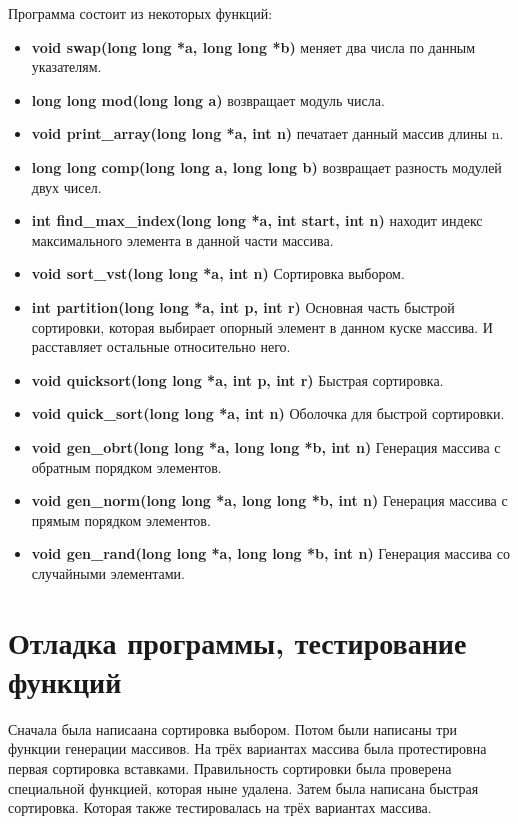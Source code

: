 \documentclass[a4paper,12pt,titlepage,final]{article}
\begin{document}
Программа состоит из некоторых функций:
\begin{itemize}
  \item {\bf void swap(long long *a, long long *b)} меняет два числа по данным указателям.
  \item {\bf long long mod(long long a)} возвращает модуль числа.
  \item {\bf void print\_array(long long *a, int n)} печатает данный массив длины n.
  \item {\bf long long comp(long long a, long long b)} возвращает разность модулей двух чисел.
  \item {\bf int find\_max\_index(long long *a, int start, int n)} находит индекс максимального элемента в данной части массива.
  \item {\bf void sort\_vst(long long *a, int n)} Сортировка выбором.
  \item {\bf int partition(long long *a, int p, int r)} Основная часть быстрой сортировки, которая выбирает опорный элемент в данном куске массива. И расставляет остальные относительно него.
  \item {\bf void quicksort(long long *a, int p, int r)} Быстрая сортировка.
  \item {\bf void quick\_sort(long long *a, int n)} Оболочка для быстрой сортировки.
  \item {\bf void gen\_obrt(long long *a, long long *b, int n)} Генерация массива с обратным порядком элементов.
  \item {\bf void gen\_norm(long long *a, long long *b, int n)} Генерация массива с прямым порядком элементов.
  \item {\bf void gen\_rand(long long *a, long long *b, int n)} Генерация массива со случайными элементами.
\end{itemize}

\newpage

\section{Отладка программы, тестирование функций}

Сначала была написаана сортировка выбором. Потом были написаны три функции генерации массивов.
На трёх вариантах массива была протестировна первая сортировка вставками. Правильность сортировки была проверена специальной функцией, которая ныне удалена. Затем была написана быстрая сортировка. Которая также тестировалась на трёх вариантах массива. 

\newpage
\end{document}
